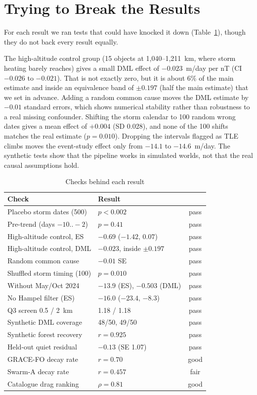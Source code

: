 \section{Trying to Break the Results}
\label{sec:robust}

For each result we ran tests that could have knocked it down (Table~\ref{tab:checks}), though
they do not back every result equally.

The high-altitude control group (15 objects at 1,040--1,211~km, where storm heating barely
reaches) gives a small DML effect of $-0.023$~m/day per nT (CI $-0.026$ to $-0.021$). That is
not exactly zero, but it is about 6\% of the main estimate and inside an equivalence band of
$\pm0.197$ (half the main estimate) that we set in advance. Adding a random common cause moves
the DML estimate by $-0.01$ standard errors, which shows numerical stability rather than
robustness to a real missing confounder. Shifting the storm calendar to 100 random wrong dates
gives a mean effect of $+0.004$ (SD 0.028), and none of the 100 shifts matches the real estimate
($p=0.010$). Dropping the intervals flagged as TLE climbs moves the event-study effect only from
$-14.1$ to $-14.6$~m/day. The synthetic tests show that the pipeline works in simulated worlds,
not that the real causal assumptions hold.

\begin{table}[t]
\caption{Checks behind each result}
\label{tab:checks}
\centering
\small
\begin{tabular}{@{}p{3.1cm}p{3.0cm}c@{}}
\toprule
Check & Result & \\
\midrule
Placebo storm dates (500) & $p<0.002$ & pass \\
Pre-trend (days $-10..-2$) & $p=0.41$ & pass \\
High-altitude control, ES & $-0.69$ ($-1.42$, $0.07$) & pass \\
High-altitude control, DML & $-0.023$, inside $\pm0.197$ & pass \\
Random common cause & $-0.01$ SE & pass \\
Shuffled storm timing (100) & $p=0.010$ & pass \\
Without May/Oct 2024 & $-13.9$ (ES), $-0.503$ (DML) & pass \\
No Hampel filter (ES) & $-16.0$ ($-23.4$, $-8.3$) & pass \\
Q3 screen 0.5 / 2~km & 1.18 / 1.18 & pass \\
Synthetic DML coverage & 48/50, 49/50 & pass \\
Synthetic forest recovery & $r=0.925$ & pass \\
Held-out quiet residual & $-0.13$ (SE 1.07) & pass \\
GRACE-FO decay rate & $r=0.70$ & good \\
Swarm-A decay rate & $r=0.457$ & fair \\
Catalogue drag ranking & $\rho=0.81$ & good \\
\bottomrule
\end{tabular}
\end{table}

